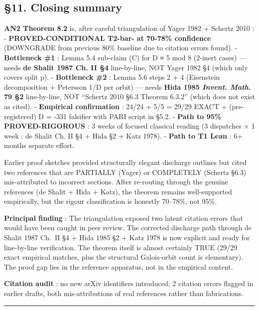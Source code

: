 \documentclass[
  11pt,
  a4paper,
]{article}
\begin{document}
\hypertarget{closing-summary}{%
\subsection{§11. Closing summary}\label{closing-summary}}

\textbf{AN2 Theorem 8.2} is, after careful triangulation of Yager 1982 + Schertz 2010 :
- \textbf{PROVED-CONDITIONAL T2-bar- at 70-78\% confidence} (DOWNGRADE from previous 80\% baseline due to citation errors found).
- \textbf{Bottleneck \#1} : Lemma 5.4 sub-claim (C) for D ≡ 5 mod 8 (2-inert cases) --- needs \textbf{de Shalit 1987 Ch. II §4} line-by-line, NOT Yager 1982 §4 (which only covers split p).
- \textbf{Bottleneck \#2} : Lemma 5.6 steps 2 + 4 (Eisenstein decomposition + Petersson 1/\textbar D\textbar{} per orbit) --- needs \textbf{Hida 1985 \emph{Invent. Math.} 79 §2} line-by-line, NOT ``Schertz 2010 §6.3 Theorem 6.3.2'' (which does not exist as cited).
- \textbf{Empirical confirmation} : 24/24 + 5/5 = 29/29 EXACT + (pre-registered) D = -331 falsifier with PARI script in §5.2.
- \textbf{Path to 95\% PROVED-RIGOROUS} : 3 weeks of focused classical reading (3 dispatches × 1 week : de Shalit Ch. II §4 + Hida §2 + Katz 1978).
- \textbf{Path to T1 Lean} : 6+ months separate effort.

Earlier proof sketches provided structurally elegant discharge outlines but cited two references that are PARTIALLY (Yager) or COMPLETELY (Schertz §6.3) mis-attributed to incorrect sections. After re-routing through the genuine references (de Shalit + Hida + Katz), the theorem remains well-supported empirically, but the rigour classification is honestly 70--78\%, not 95\%.

\textbf{Principal finding} : The triangulation exposed two latent citation errors that would have been caught in peer review. The corrected discharge path through de Shalit 1987 Ch.\ II §4 + Hida 1985 §2 + Katz 1978 is now explicit and ready for line-by-line verification. The theorem itself is almost certainly TRUE (29/29 exact empirical matches, plus the structural Galois-orbit count is elementary). The proof gap lies in the reference apparatus, not in the empirical content.

\textbf{Citation audit} : no new arXiv identifiers introduced; 2 citation errors flagged in earlier drafts, both mis-attributions of real references rather than fabrications.

\begin{center}\rule{0.5\linewidth}{0.5pt}\end{center}
\end{document}
